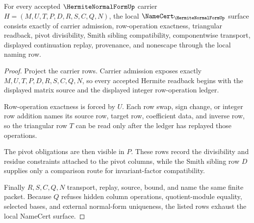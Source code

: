 \begin{theorem}
\label{thm:hermite-normal-form-namecert-obligations}
For every accepted $\HermiteNormalFormUp$ carrier $H=(M,U,T,P,D,R,S,C,Q,N)$, the local $\NameCert_{\HermiteNormalFormUp}$ surface consists exactly of carrier admission, row-operation exactness, triangular readback, pivot divisibility, Smith sibling compatibility, componentwise transport, displayed continuation replay, provenance, and nonescape through the local naming row.
\end{theorem}
\begin{proof}
Project the carrier rows. Carrier admission exposes exactly $M,U,T,P,D,R,S,C,Q,N$, so every accepted Hermite readback begins with the displayed matrix source and the displayed integer row-operation ledger.

Row-operation exactness is forced by $U$. Each row swap, sign change, or integer row addition names its source row, target row, coefficient data, and inverse row, so the triangular row $T$ can be read only after the ledger has replayed those operations.

The pivot obligations are then visible in $P$. These rows record the divisibility and residue constraints attached to the pivot columns, while the Smith sibling row $D$ supplies only a comparison route for invariant-factor compatibility.

Finally $R,S,C,Q,N$ transport, replay, source, bound, and name the same finite packet. Because $Q$ refuses hidden column operations, quotient-module equality, selected bases, and external normal-form uniqueness, the listed rows exhaust the local NameCert surface.
\end{proof}

